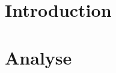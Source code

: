 \documentclass[11pt,a4paper]{report}
\author{Typhaine PL}
\begin{document}
\tableofcontents
\chapter*{Introduction}

\chapter{Analyse}


\pagebreak

\pagebreak








\end{document}
